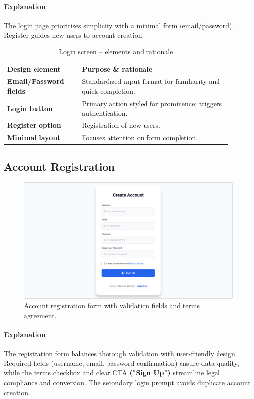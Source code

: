 \documentclass[12pt]{article}
\begin{document}
	\paragraph{Explanation}%
	The login page prioritizes simplicity with a minimal form (email/password).
	Register guides new users to account creation. 
	\begin{table}[H]
		\centering
		\caption{Login screen – elements and rationale}
		\label{tab:login-elements}
		\begin{tabular}{p{0.30\linewidth} p{0.60\linewidth}}
			\hline
			\textbf{Design element} & \textbf{Purpose \& rationale} \\ 	\hline
			\textbf{Email/Password fields}  & Standardized input format for familiarity and quick completion. \\
			\textbf{Login button}       	& Primary action styled for prominence; triggers authentication. \\
			\textbf{Register option}        & Registration of new users. \\
			\textbf{Minimal layout}         & Focuses attention on form completion. \\
			\hline
		\end{tabular}
	\end{table}

	\subsection{Account Registration}\label{subsec:account-registration}

	\begin{figure}[H]
		\centering
		\includegraphics[width=0.6\linewidth]{pictures/main/RegisterAccount_Figma}%
		\caption{Account registration form with validation fields and terms agreement.}
		\label{fig:ui-register}
	\end{figure}

	\paragraph{Explanation}%
	The registration form balances thorough validation with user-friendly design.
	Required fields (username, email, password confirmation) ensure data quality, while the terms checkbox and clear CTA \textbf{("Sign Up")} streamline legal compliance and conversion.
	The secondary login prompt avoids duplicate account creation.
\end{document}
